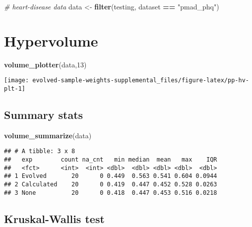 \documentclass[
]{book}
\newenvironment{Shaded}{\begin{snugshade}}{\end{snugshade}}
\newcommand{\CommentTok}[1]{\textcolor[rgb]{0.56,0.35,0.01}{\textit{#1}}}
\newcommand{\DecValTok}[1]{\textcolor[rgb]{0.00,0.00,0.81}{#1}}
\newcommand{\FunctionTok}[1]{\textcolor[rgb]{0.13,0.29,0.53}{\textbf{#1}}}
\newcommand{\NormalTok}[1]{#1}
\newcommand{\OtherTok}[1]{\textcolor[rgb]{0.56,0.35,0.01}{#1}}
\newcommand{\SpecialCharTok}[1]{\textcolor[rgb]{0.81,0.36,0.00}{\textbf{#1}}}
\newcommand{\StringTok}[1]{\textcolor[rgb]{0.31,0.60,0.02}{#1}}
\begin{document}
\begin{Shaded}
\begin{Highlighting}[]
\CommentTok{\# heart{-}disease data}
\NormalTok{data }\OtherTok{\textless{}{-}} \FunctionTok{filter}\NormalTok{(testing, dataset }\SpecialCharTok{==} \StringTok{"pmad\_phq"}\NormalTok{)}
\end{Highlighting}
\end{Shaded}

\hypertarget{hypervolume-11}{%
\section{Hypervolume}\label{hypervolume-11}}

\begin{Shaded}
\begin{Highlighting}[]
\FunctionTok{volume\_plotter}\NormalTok{(data,}\DecValTok{13}\NormalTok{)}
\end{Highlighting}
\end{Shaded}

\texttt{[image: evolved-sample-weights-supplemental\_files/figure-latex/pp-hv-plt-1]}

\hypertarget{summary-stats-11}{%
\subsection{Summary stats}\label{summary-stats-11}}

\begin{Shaded}
\begin{Highlighting}[]
\FunctionTok{volume\_summarize}\NormalTok{(data)}
\end{Highlighting}
\end{Shaded}

\begin{verbatim}
## # A tibble: 3 x 8
##   exp        count na_cnt   min median  mean   max    IQR
##   <fct>      <int>  <int> <dbl>  <dbl> <dbl> <dbl>  <dbl>
## 1 Evolved       20      0 0.449  0.563 0.541 0.604 0.0944
## 2 Calculated    20      0 0.419  0.447 0.452 0.528 0.0263
## 3 None          20      0 0.418  0.447 0.453 0.516 0.0218
\end{verbatim}

\hypertarget{kruskal-wallis-test-11}{%
\subsection{Kruskal-Wallis test}\label{kruskal-wallis-test-11}}
\end{document}

